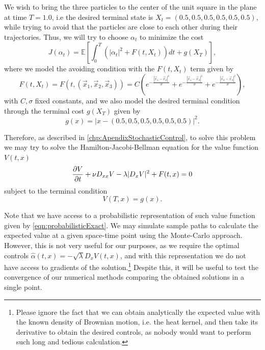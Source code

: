 We wish to bring the three particles to the center of the unit square in the plane at time $T=1.0$, i.e the desired terminal state is $X_t=(0.5,0.5,0.5,0.5,0.5,0.5)$, while trying to avoid that the particles are close to each other during their trajectories. Thus, we will try to choose $\alpha_t$ to minimize the cost
\begin{equation}
	J(\alpha_t)=\mathbb{E}\left[\int_{0}^{T}(|\alpha_t|^2+F(t,X_t)) dt +g(X_T)\right],
\end{equation}   
where we model the avoiding condition with the $F(t,X_t)$ term given by
\begin{equation}
	F(t,X_t)=F(t,(\vec{x}_1,\vec{x}_2,\vec{x}_3))=C\left(e^{-\frac{|\vec{x}_1-\vec{x}_2|^2}{\sigma}}+e^{-\frac{|\vec{x}_1-\vec{x}_3|^2}{\sigma}}+e^{-\frac{|\vec{x}_2-\vec{x}_3|^2}{\sigma}}\right),
\end{equation}
with $C,\sigma$ fixed constants, and we also model the desired terminal condition through the terminal cost $g(X_T)$ given by 
\begin{equation}
	g(x)=|x-(0.5,0.5,0.5,0.5,0.5,0.5)|^2.
\end{equation}

Therefore, as described in \autoref{chp:ApendixStochasticControl}, to solve this problem we may try to solve the Hamilton-Jacobi-Bellman equation for the value function $V(t,x)$
\begin{equation}
	\label{eqn:HJB_example}
	\frac{\partial V}{\partial t}+\nu D_{xx} V -\lambda | D_x V|^2+F(t,x)=0
\end{equation}
subject to the terminal condition 
\begin{equation}
	V(T,x)=g(x).
\end{equation}

Note that we have access to a probabilistic representation of such value function given by \eqref{eqn:probabilisticExact}. We may simulate sample paths to calculate the expected value at a given space-time point using the Monte-Carlo approach. However, this is not very useful for our purposes, as we require the optimal controls $\hat{\alpha}(t,x)=-\sqrt{\lambda}D_x V(t,x)$, and with this representation we do not have access to gradients of the solution.\footnote{Please ignore the fact that we can obtain analytically the expected value with the known density of Brownian motion, i.e. the heat kernel, and then take its derivative to obtain the desired controls, as nobody would want to perform such long and tedious calculation.} Despite this, it will be useful to test the convergence of our numerical methods comparing the obtained solutions in a single point.

